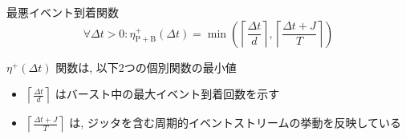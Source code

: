 \begin{frame}{最悪イベント到着関数}
    \begin{equation*}
        \forall \Delta t>0: \eta_{\mathrm{P}+\mathrm{B}}^{+}(\Delta t)=\min \left(\left\lceil\frac{\Delta t}{d}\right\rceil,\left\lceil\frac{\Delta t+J}{T}\right\rceil\right)
    \end{equation*}

    $\eta^{+}(\Delta t)$ 関数は, 以下2つの個別関数の最小値
    \begin{itemize}
        \item $\left\lceil\frac{\Delta t}{d}\right\rceil$ はバースト中の最大イベント到着回数を示す
        \item $\left\lceil\frac{\Delta t+J}{T}\right\rceil$ は, ジッタを含む周期的イベントストリームの挙動を反映している
    \end{itemize}
\end{frame}




